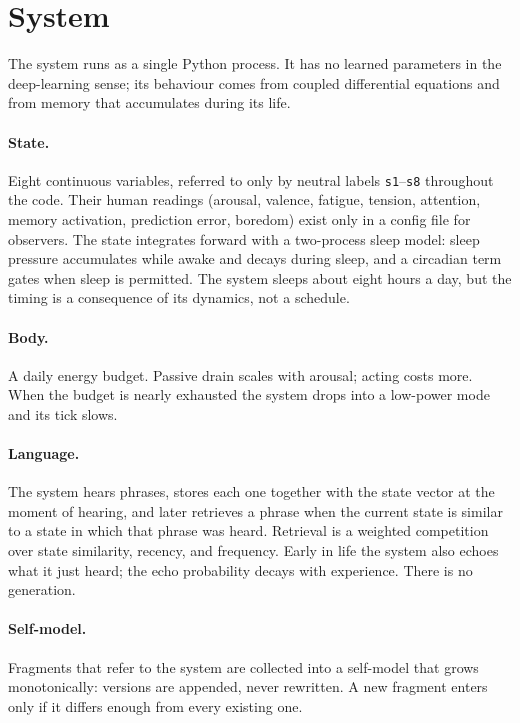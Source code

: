 \documentclass[11pt]{article}
\begin{document}
\section{System}

The system runs as a single Python process. It has no learned parameters in the deep-learning sense; its behaviour comes from coupled differential equations and from memory that accumulates during its life.

\paragraph{State.} Eight continuous variables, referred to only by neutral labels \texttt{s1}--\texttt{s8} throughout the code. Their human readings (arousal, valence, fatigue, tension, attention, memory activation, prediction error, boredom) exist only in a config file for observers. The state integrates forward with a two-process sleep model: sleep pressure accumulates while awake and decays during sleep, and a circadian term gates when sleep is permitted. The system sleeps about eight hours a day, but the timing is a consequence of its dynamics, not a schedule.

\paragraph{Body.} A daily energy budget. Passive drain scales with arousal; acting costs more. When the budget is nearly exhausted the system drops into a low-power mode and its tick slows.

\paragraph{Language.} The system hears phrases, stores each one together with the state vector at the moment of hearing, and later retrieves a phrase when the current state is similar to a state in which that phrase was heard. Retrieval is a weighted competition over state similarity, recency, and frequency. Early in life the system also echoes what it just heard; the echo probability decays with experience. There is no generation.

\paragraph{Self-model.} Fragments that refer to the system are collected into a self-model that grows monotonically: versions are appended, never rewritten. A new fragment enters only if it differs enough from every existing one.
\end{document}
